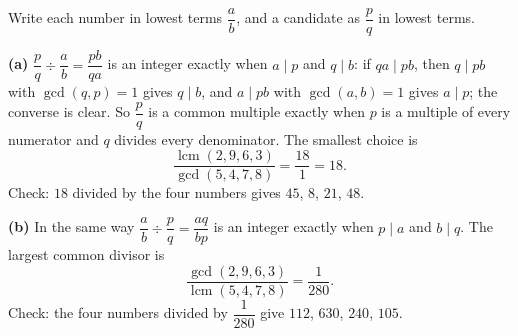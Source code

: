Write each number in lowest terms $\dfrac {a}{b}$, and a candidate as $\dfrac {p}{q}$ in lowest terms.

\textbf{(a)} $\dfrac {p}{q}\div\dfrac {a}{b}=\dfrac{pb}{qa}$ is an integer exactly when $a\mid p$ and $q\mid b$: if $qa\mid pb$, then $q\mid pb$ with $\gcd(q,p)=1$ gives $q\mid b$, and $a\mid pb$ with $\gcd(a,b)=1$ gives $a\mid p$; the converse is clear. So $\dfrac {p}{q}$ is a common multiple exactly when $p$ is a multiple of every numerator and $q$ divides every denominator. The smallest choice is
\[\dfrac{\operatorname{lcm}(2,9,6,3)}{\gcd(5,4,7,8)}=\dfrac{18}{1}=\boxed{18}.\]
Check: $18$ divided by the four numbers gives $45$, $8$, $21$, $48$.

\textbf{(b)} In the same way $\dfrac {a}{b}\div\dfrac {p}{q}=\dfrac{aq}{bp}$ is an integer exactly when $p\mid a$ and $b\mid q$. The largest common divisor is
\[\dfrac{\gcd(2,9,6,3)}{\operatorname{lcm}(5,4,7,8)}=\boxed{\dfrac{1}{280}}.\]
Check: the four numbers divided by $\dfrac{1}{280}$ give $112$, $630$, $240$, $105$.
